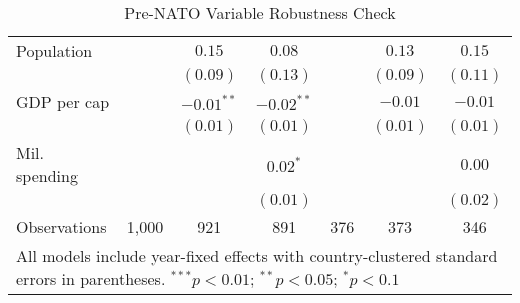 \begin{table}[h]
\begin{center}
\begin{tabular}{l c c c c c c}
\quad Population      &               & $0.15$        & $0.08$        &               & $0.13$        & $0.15$        \\
                      &               & $(0.09)$      & $(0.13)$      &               & $(0.09)$      & $(0.11)$      \\
\quad GDP per cap     &               & $-0.01^{**}$  & $-0.02^{**}$  &               & $-0.01$       & $-0.01$       \\
                      &               & $(0.01)$      & $(0.01)$      &               & $(0.01)$      & $(0.01)$      \\
\quad Mil. spending   &               &               & $0.02^{*}$    &               &               & $0.00$        \\
                      &               &               & $(0.01)$      &               &               & $(0.02)$      \\
\hline
Observations          & 1,000         & 921           & 891           & 376           & 373           & 346           \\
\hline
\multicolumn{7}{l}{\scriptsize{All models include year-fixed effects with country-clustered standard errors in parentheses. $^{***}p<0.01$; $^{**}p<0.05$; $^{*}p<0.1$}}
\end{tabular}
\caption{Pre-NATO Variable Robustness Check}
\label{table:prenato-results}
\end{center}
\end{table}
